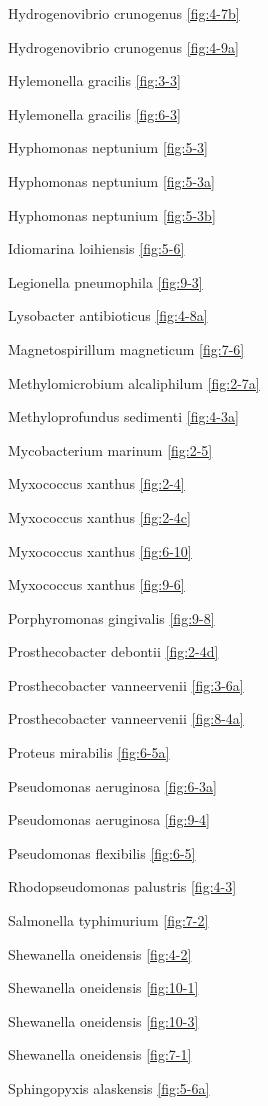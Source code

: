 \documentclass[]{tufte-book}
\begin{document}
Hydrogenovibrio crunogenus \ref{fig:4-7b}

Hydrogenovibrio crunogenus \ref{fig:4-9a}

Hylemonella gracilis \ref{fig:3-3}

Hylemonella gracilis \ref{fig:6-3}

Hyphomonas neptunium \ref{fig:5-3}

Hyphomonas neptunium \ref{fig:5-3a}

Hyphomonas neptunium \ref{fig:5-3b}

Idiomarina loihiensis \ref{fig:5-6}

Legionella pneumophila \ref{fig:9-3}

Lysobacter antibioticus \ref{fig:4-8a}

Magnetospirillum magneticum \ref{fig:7-6}

Methylomicrobium alcaliphilum \ref{fig:2-7a}

Methyloprofundus sedimenti \ref{fig:4-3a}

Mycobacterium marinum \ref{fig:2-5}

Myxococcus xanthus \ref{fig:2-4}

Myxococcus xanthus \ref{fig:2-4c}

Myxococcus xanthus \ref{fig:6-10}

Myxococcus xanthus \ref{fig:9-6}

Porphyromonas gingivalis \ref{fig:9-8}

Prosthecobacter debontii \ref{fig:2-4d}

Prosthecobacter vanneervenii \ref{fig:3-6a}

Prosthecobacter vanneervenii \ref{fig:8-4a}

Proteus mirabilis \ref{fig:6-5a}

Pseudomonas aeruginosa \ref{fig:6-3a}

Pseudomonas aeruginosa \ref{fig:9-4}

Pseudomonas flexibilis \ref{fig:6-5}

Rhodopseudomonas palustris \ref{fig:4-3}

Salmonella typhimurium \ref{fig:7-2}

Shewanella oneidensis \ref{fig:4-2}

Shewanella oneidensis \ref{fig:10-1}

Shewanella oneidensis \ref{fig:10-3}

Shewanella oneidensis \ref{fig:7-1}

Sphingopyxis alaskensis \ref{fig:5-6a}
\end{document}
